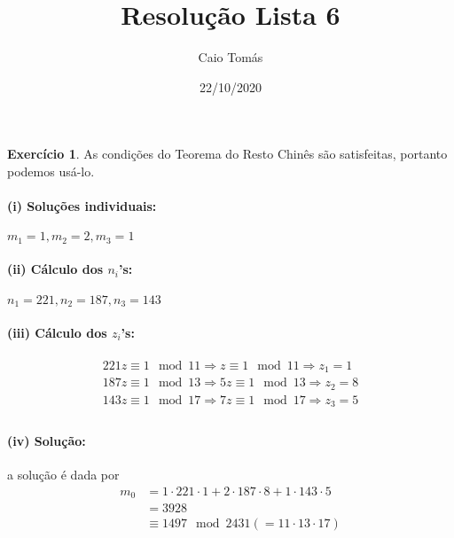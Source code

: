 \documentclass[a4paper,12pt]{article}
\title{Resolução Lista 6}
\date{22/10/2020}
\author{Caio Tomás}
\theoremstyle{definition}
\newtheorem{exercise}{Exercício}%
\begin{document}
	\maketitle
	\begin{exercise}
		As condições do Teorema do Resto Chinês são satisfeitas, portanto podemos usá-lo. 
		\paragraph{(i) Soluções individuais:} $m_1 = 1, m_2 = 2, m_3 = 1$
		\paragraph{(ii) Cálculo dos $n_i$'s:} $n_1 = 221, n_2 = 187, n_3 = 143$
		\paragraph{(iii) Cálculo dos $z_i$'s:} 
		\begin{align*}
		221z\equiv 1\mod 11 \Rightarrow z\equiv 1\mod 11 \Rightarrow z_1 = 1 \\
		187z\equiv 1\mod 13 \Rightarrow 5z\equiv 1\mod 13 \Rightarrow z_2 = 8 \\
		143z\equiv 1\mod 17 \Rightarrow 7z\equiv 1\mod 17 \Rightarrow z_3 = 5 \\
		\end{align*}
		\paragraph{(iv) Solução:} a solução é dada por
		\begin{align*}
		m_0 &= 1\cdot 221\cdot 1 + 2\cdot 187\cdot 8 + 1\cdot 143\cdot 5 \\
		&= 3928 \\
		&\equiv 1497 \mod 2431 (= 11\cdot 13\cdot 17)
		\end{align*} 
	\end{exercise}
\end{document}
